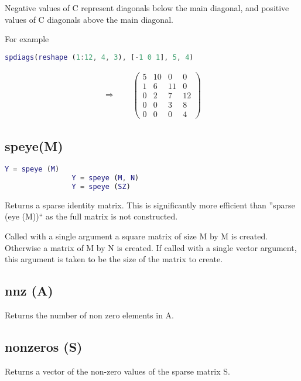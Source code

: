 \documentclass[a4paper]{scrartcl}
\begin{document}
			Negative values of C represent diagonals below the main diagonal,
     		and positive values of C diagonals above the main diagonal.

     		For example
			\begin{lstlisting}[language=matlab]
				spdiags(reshape (1:12, 4, 3), [-1 0 1], 5, 4)
			\end{lstlisting}
			\begin{align*}
	\Longrightarrow	\qquad	\begin{pmatrix}
								5& 10&  0&  0\\
								1&  6& 11&  0\\
								0&  2&  7& 12\\
								0&  0&  3&  8\\
								0&  0&  0&  4
							\end{pmatrix}
			\end{align*}
	\subsection{speye(M)}
			\begin{lstlisting}[language=matlab]
				Y = speye (M)
				Y = speye (M, N)
				Y = speye (SZ)
			\end{lstlisting}

			Returns a sparse identity matrix.  This is significantly more
			efficient than ''sparse (eye (M))`` as the full matrix is not
			constructed.

			Called with a single argument a square matrix of size M by M is
			created.  Otherwise a matrix of M by N is created.  If called with
			a single vector argument, this argument is taken to be the size of
			the matrix to create.

	\subsection{nnz (A)}
			Returns the number of non zero elements in A.
	\subsection{nonzeros (S)}
			Returns a vector of the non-zero values of the sparse matrix S.
\end{document}
